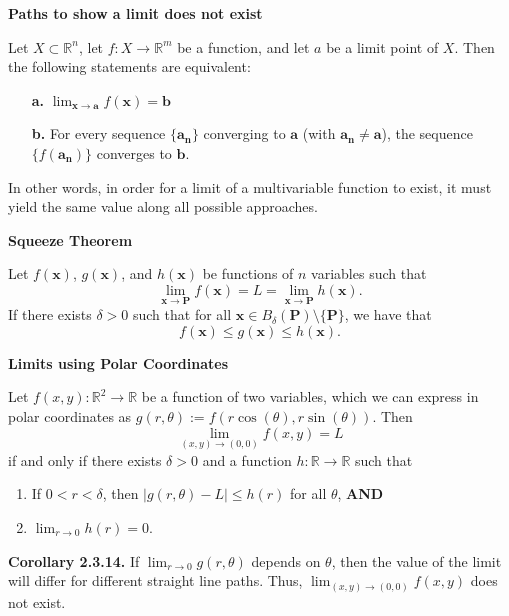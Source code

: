 \documentclass{article}
\begin{document}
\noindent \textbf{Paths to show a limit does not exist}

Let \( X \subset \mathbb{R}^n \), let \( f : X \rightarrow \mathbb{R}^m \) be a function, and let \( a \) be a limit point of \( X \). Then the following statements are equivalent:
\begin{enumerate}
    \item[\textbf{a.}] \(\lim_{\bm{x} \to \bm{a}} f(\bm{x}) = \bm{b}\)
    
    \item[\textbf{b.}] For every sequence \(\{\bm{a_n}\}\) converging to \(\bm{a}\) (with \(\bm{a_n} \neq \bm{a}\)), the sequence \(\{f(\bm{a_n})\}\) converges to \(\bm{b}\).
\end{enumerate}
In other words, in order for a limit of a multivariable function to exist, it must yield the same value along all possible approaches.


\vspace{0.5cm}

\noindent \textbf{Squeeze Theorem}

Let \( f(\bm{x}) \), \( g(\bm{x}) \), and \( h(\bm{x}) \) be functions of \( n \) variables such that 
\[\lim_{\bm{x} \to \bm{P}} f(\bm{x}) = L = \lim_{\bm{x} \to \bm{P}} h(\bm{x}).\]
If there exists \(\delta > 0\) such that for all \( \bm{x} \in B_{\delta}(\bm{P}) \setminus \{\bm{P}\} \), we have that 
\[f(\bm{x}) \leq g(\bm{x}) \leq h(\bm{x}).\]

\vspace{0.5cm}

\noindent \textbf{Limits using Polar Coordinates}

Let \( f(x, y) : \mathbb{R}^2 \rightarrow \mathbb{R} \) be a function of two variables, which we can express in polar coordinates as \( g(r, \theta) := f(r \cos(\theta), r \sin(\theta)) \). Then 
\[\lim_{(x,y) \to (0,0)} f(x,y) = L\]
if and only if there exists \(\delta > 0\) and a function \( h : \mathbb{R} \rightarrow \mathbb{R} \) such that
\begin{enumerate}
    \item If \(0 < r < \delta\), then \(\left| g(r,\theta) - L \right| \leq h(r)\) for all \(\theta\), \textbf{AND}
    \item \(\lim_{r \to 0} h(r) = 0\).
\end{enumerate}

\textbf{Corollary 2.3.14.} If \(\lim_{r \to 0} g(r,\theta)\) depends on \(\theta\), then the value of the limit will differ for different straight line paths. Thus, \(\lim_{(x,y) \to (0,0)} f(x,y)\) does not exist.
\end{document}
